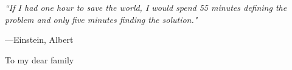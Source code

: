 \documentclass[12pt,a4paper,twoside]{Thesis} %
\theoremstyle{definition}
\begin{document}
\pagestyle{empty} %
\emph{``If I had one hour to save the world, I would spend 55 minutes defining the problem and only five minutes finding the solution."}

\begin{flushright}
---Einstein, Albert
\end{flushright}
\null\vfill %

\begin{center}
\large{To my dear family}
\end{center}
\vfill\vfill\null %

\cleardoublepage %


\end{document}
